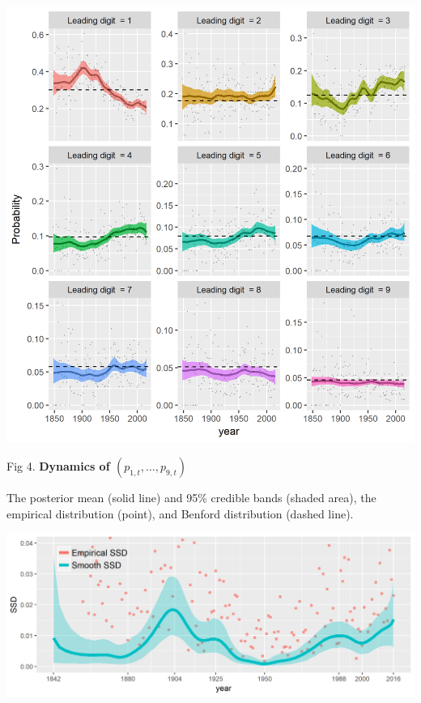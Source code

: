 \documentclass[a0paper,portrait]{baposter}
\renewcommand{\baselinestretch}{1}
\begin{document}
\begin{poster}
{\begin{minipage}[l]{0.53\textwidth}
\end{minipage}
\hfill
\begin{minipage}[c]{0.45\textwidth}
\includegraphics[width=1\linewidth]{Fig3}
\begin{center}
\vspace{-0.4cm}
\scriptsize Fig 4. \textbf{Dynamics of $(p_{1,t},\ldots,p_{9,t})$}\\ 
\end{center}
\begin{flushleft}
\vspace{-0.3cm}
\begin{myindentpar}{0.5cm}
\renewcommand{\baselinestretch}{0.8}
\scriptsize The posterior mean (solid line) and 95\%  credible bands (shaded area), the empirical distribution (point), and  Benford distribution (dashed line).
\end{myindentpar}
\end{flushleft}
\vspace{0.1cm}
\includegraphics[width=1\linewidth]{Fig4}

\end{minipage}}
\end{poster}
\end{document}
